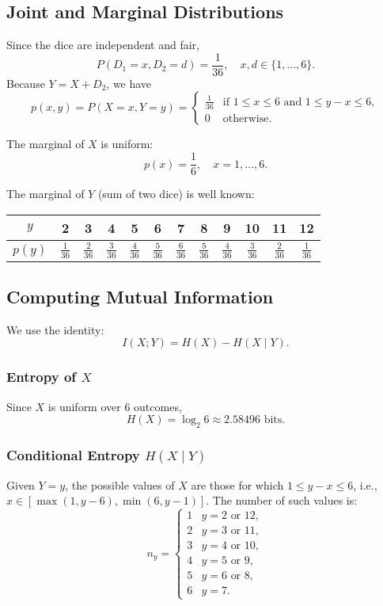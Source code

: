 \documentclass{article}
\begin{document}
\subsection*{Joint and Marginal Distributions}

Since the dice are independent and fair,
\[
P(D_1 = x, D_2 = d) = \frac{1}{36}, \quad x,d \in \{1,\dots,6\}.
\]
Because \(Y = X + D_2\), we have
\[
p(x, y) = P(X = x, Y = y) =
\begin{cases}
\frac{1}{36} & \text{if } 1 \le x \le 6 \text{ and } 1 \le y - x \le 6, \\
0 & \text{otherwise}.
\end{cases}
\]

The marginal of \(X\) is uniform:
\[
p(x) = \frac{1}{6}, \quad x = 1,\dots,6.
\]

The marginal of \(Y\) (sum of two dice) is well known:
\begin{center}
\begin{tabular}{c|ccccccccccc}
\(y\) & 2 & 3 & 4 & 5 & 6 & 7 & 8 & 9 & 10 & 11 & 12 \\
\midrule
\(p(y)\) & \(\frac{1}{36}\) & \(\frac{2}{36}\) & \(\frac{3}{36}\) & \(\frac{4}{36}\) & \(\frac{5}{36}\) & \(\frac{6}{36}\) & \(\frac{5}{36}\) & \(\frac{4}{36}\) & \(\frac{3}{36}\) & \(\frac{2}{36}\) & \(\frac{1}{36}\)
\end{tabular}
\end{center}

\subsection*{Computing Mutual Information}

We use the identity:
\[
I(X;Y) = H(X) - H(X \mid Y).
\]

\subsubsection*{Entropy of \(X\)}
Since \(X\) is uniform over 6 outcomes,
\[
H(X) = \log_2 6 \approx 2.58496 \text{ bits}.
\]

\subsubsection*{Conditional Entropy \(H(X \mid Y)\)}

Given \(Y = y\), the possible values of \(X\) are those for which \(1 \le y - x \le 6\), i.e., \(x \in [\max(1, y-6), \min(6, y-1)]\). The number of such values is:
\[
n_y = 
\begin{cases}
1 & y = 2 \text{ or } 12, \\
2 & y = 3 \text{ or } 11, \\
3 & y = 4 \text{ or } 10, \\
4 & y = 5 \text{ or } 9, \\
5 & y = 6 \text{ or } 8, \\
6 & y = 7.
\end{cases}
\]
\end{document}
